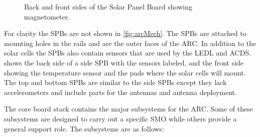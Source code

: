 \begin{figure}[!ht]
    
    \caption{Back and front sides of the Solar Panel Board showing magnetometer.}
    \label{fig:SPB}
\end{figure}

For clarity the \acp{SPB} are not shown in \cref{fig:arcMech}. The \acp{SPB} are attached to mounting holes in the rails and are the outer faces of the \ac{ARC}. In addition to the solar cells the \acp{SPB} also contain sensors that are used by the \ac{LEDL} and \ac{ACDS}.  shows the back side of a side \ac{SPB} with the sensors labeled, and the front side showing the temperature sensor and the pads where the solar cells will mount. The top and bottom \acp{SPB} are similar to the side \acp{SPB} except they lack accelerometers and include parts for the antennas and antenna deployment.

The core board stack contains the major subsystems for the \ac{ARC}. Some of these subsystems are designed to carry out a specific \ac{SMO} while others provide a general support role. The subsystems are as follows:

